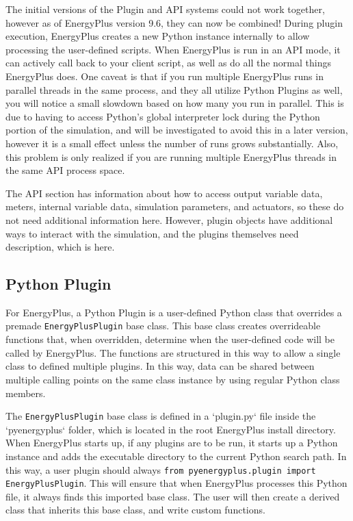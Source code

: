 The initial versions of the Plugin and API systems could not work together, however as of EnergyPlus version 9.6, they can now be combined!
During plugin execution, EnergyPlus creates a new Python instance internally to allow processing the user-defined scripts.
When EnergyPlus is run in an API mode, it can actively call back to your client script, as well as do all the normal things EnergyPlus does.
One caveat is that if you run multiple EnergyPlus runs in parallel threads in the same process, and they all utilize Python Plugins as well, you will notice a small slowdown based on how many you run in parallel.
This is due to having to access Python's global interpreter lock during the Python portion of the simulation, and will be investigated to avoid this in a later version, however it is a small effect unless the number of runs grows substantially.
Also, this problem is only realized if you are running multiple EnergyPlus threads in the same API process space.

The API section has information about how to access output variable data, meters, internal variable data, simulation parameters, and actuators, so these do not need additional information here.
However, plugin objects have additional ways to interact with the simulation, and the plugins themselves need description, which is here.

\subsection{Python Plugin}

For EnergyPlus, a Python Plugin is a user-defined Python class that overrides a premade \verb=EnergyPlusPlugin= base class.
This base class creates overrideable functions that, when overridden, determine when the user-defined code will be called by EnergyPlus.
The functions are structured in this way to allow a single class to defined multiple plugins.
In this way, data can be shared between multiple calling points on the same class instance by using regular Python class members.

The \verb=EnergyPlusPlugin= base class is defined in a `plugin.py` file inside the `pyenergyplus` folder, which is located in the root EnergyPlus install directory.
When EnergyPlus starts up, if any plugins are to be run, it starts up a Python instance and adds the executable directory to the current Python search path.
In this way, a user plugin should always \verb=from pyenergyplus.plugin import EnergyPlusPlugin=.
This will ensure that when EnergyPlus processes this Python file, it always finds this imported base class.
The user will then create a derived class that inherits this base class, and write custom functions.

